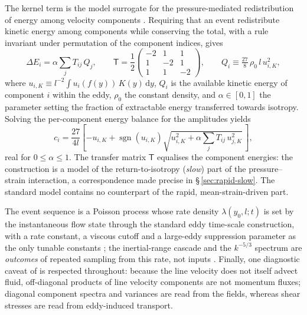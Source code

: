 \documentclass[lineno]{JFM-FLM_Au}
\begin{document}
The kernel term is the model surrogate for the pressure-mediated
redistribution of energy among velocity components
\citep{WunschKerstein2001,Kerstein2001}. Requiring that an event
redistribute kinetic energy among components while conserving the total,
with a rule invariant under permutation of the component indices, gives
\begin{equation}
  \Delta E_i = \alpha\sum_j T_{ij}\,Q_j,
  \qquad
  \mathsf{T}=\frac{1}{2}
  \begin{pmatrix}
    -2 & 1 & 1\\ 1 & -2 & 1\\ 1 & 1 & -2
  \end{pmatrix},
  \qquad
  Q_i\equiv\tfrac{27}{8}\,\rho_0\, l\, u_{i,K}^2,
  \label{eq:redistribution}
\end{equation}
where $u_{i,K}\equiv l^{-2}\!\int u_i(f(y))\,K(y)\,\mathrm{d}y$, $Q_i$ is
the available kinetic energy of component $i$ within the eddy, $\rho_0$
the constant density, and $\alpha\in[0,1]$ the parameter setting the
fraction of extractable energy transferred towards isotropy. Solving the
per-component energy balance for the amplitudes yields
\begin{equation}
  c_i = \frac{27}{4l}\left[-u_{i,K}
        +\operatorname{sgn}(u_{i,K})
        \sqrt{u_{i,K}^2+\alpha\sum_j T_{ij}\,u_{j,K}^2}\,\right],
  \label{eq:ci}
\end{equation}
real for $0\le\alpha\le1$. The transfer matrix $\mathsf{T}$ equalises the
component energies: the construction is a model of the
return-to-isotropy (\emph{slow}) part of the pressure--strain
interaction, a correspondence made precise in \S\,\ref{sec:rapid-slow}.
The standard model contains no counterpart of the rapid,
mean-strain-driven part.

The event sequence is a Poisson process whose rate density
$\lambda(y_0,l;t)$ is set by the instantaneous flow state through the
standard eddy time-scale construction, with a rate constant, a viscous
cutoff and a large-eddy suppression parameter as the only tunable
constants \citep{Kerstein1999,StephensLignell2021}; the inertial-range
cascade and the $k^{-5/3}$ spectrum are \emph{outcomes} of repeated
sampling from this rate, not inputs \citep{Kerstein1999}. Finally, one
diagnostic caveat of \citet{Kerstein2001} is respected throughout:
because the line velocity does not itself advect fluid, off-diagonal
products of line velocity components are not momentum fluxes; diagonal
component spectra and variances are read from the fields, whereas shear
stresses are read from eddy-induced transport.
\end{document}
